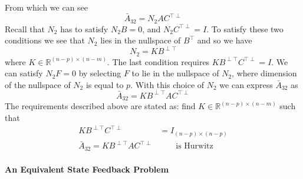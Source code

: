 \documentclass[]{../sty/aiaa-tc}
\begin{document}
  From which we can see
  \begin{equation*}
    \bar{A}_{32}=N_{2}AC^{\top\perp}
  \end{equation*}
  Recall that $N_{2}$ has to satisfy $N_{2}B=0$, and $N_{2}C^{\top\perp}=I$.
  To satisfy these two conditions we see that $N_{2}$ lies in the nullspace of $B^{\top}$ and so we have
  \begin{equation}
    \label{eqn.N2}
    N_{2}=KB^{\perp\top}
  \end{equation}
  where $K\in\mathbb{R}^{(n-p)\times(n-m)}$.
  The last condition requires $KB^{\perp\top}C^{\top\perp}=I$.
  We can satisfy $N_{2}F=0$ by selecting $F$ to lie in the nullspace of $N_{2}$, where dimension of the nullspace of $N_{2}$ is equal to $p$.
  With this choice of $N_{2}$  we can express $\bar{A}_{32}$ as
  \begin{equation*}
    \bar{A}_{32}=KB^{\perp\top}AC^{\top\perp}
  \end{equation*}
  The requirements described above are stated as: find $K\in\mathbb{R}^{(n-p)\times(n-m)}$ such that
  \begin{align}
    \label{eqn.Kgeninv}
    KB^{\perp\top}C^{\top\perp}&=I_{(n-p)\times(n-p)} \\
    \label{eqn.XiigK}
    \bar{A}_{32}=KB^{\perp\top}AC^{\top\perp}&\qquad\text{is Hurwitz}
  \end{align}

  \paragraph{An Equivalent State Feedback Problem}
\end{document}
